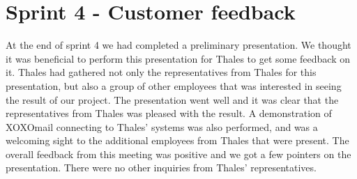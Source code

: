 \section{Sprint 4 - Customer feedback}
At the end of sprint 4 we had completed a preliminary presentation. We thought it was beneficial to perform this presentation for Thales to get some feedback on it. Thales had gathered not only the representatives from Thales for this presentation, but also a group of other employees that was interested in seeing the result of our project. The presentation went well and it was clear that the representatives from Thales was pleased with the result. A demonstration of XOXOmail connecting to Thales' systems was also performed, and was a welcoming sight to the additional employees from Thales that were present. 
\newline
\newline
The overall feedback from this meeting was positive and we got a few pointers on the presentation. There were no other inquiries from Thales' representatives.
